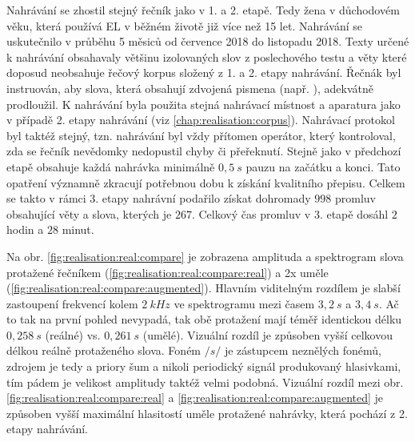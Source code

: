 Nahrávání se zhostil stejný řečník jako v 1. a 2. etapě. Tedy žena v důchodovém věku, která používá EL v běžném životě již více než 15 let. Nahrávání se uskutečnilo v průběhu 5 měsiců od července 2018 do listopadu 2018. Texty určené k nahrávání obsahavaly většinu izolovaných slov z poslechového testu a věty které doposud neobsahuje řečový korpus složený z 1. a 2. etapy nahrávání. Řečnák byl instruován, aby slova, která obsahují zdvojená pismena (např. ), adekvátně prodloužil. K nahrávání byla použita stejná nahrávací místnost a aparatura jako v případě 2. etapy nahrávání (viz \ref{chap:realisation:corpus}). Nahrávací protokol byl taktéž stejný, tzn. nahrávání byl vždy přítomen operátor, který kontroloval, zda se řečník nevědomky nedopustil chyby či přeřeknutí. Stejně jako v předchozí etapě obsahuje každá nahrávka minimálně $0,5\ s$ pauzu na začátku a konci. Tato opatření významně zkracují potřebnou dobu k získání kvalitního přepisu.
Celkem se takto v rámci 3. etapy nahrávní podařilo získat dohromady $998$ promluv obsahující věty a slova, kterých je $267$. Celkový čas promluv v 3. etapě dosáhl $2$ hodin a $28$ minut.

Na obr. \ref{fig:realisation:real:compare} je zobrazena amplituda a spektrogram slova  protažené řečníkem (\ref{fig:realisation:real:compare:real}) a 2x uměle (\ref{fig:realisation:real:compare:augmented}). Hlavním viditelným rozdílem je slabší zastoupení frekvencí kolem $2\ kHz$ ve spektrogramu mezi časem $3,2\ s$ a $3,4\ s$. Ač to tak na první pohled nevypadá, tak obě protažení mají téměř identickou délku $0,258\ s$ (reálné) vs. $0,261\ s$ (umělé). Vizuální rozdíl je způsoben vyšší celkovou délkou reálně protaženého slova. Foném $/s/$ je zástupcem neznělých fonémů, zdrojem je tedy a priory šum a nikoli periodický signál produkovaný hlasivkami, tím pádem je velikost amplitudy taktéž velmi podobná. Vizuální rozdíl mezi obr. \ref{fig:realisation:real:compare:real} a \ref{fig:realisation:real:compare:augmented} je způsoben vyšší maximální hlasitostí uměle protažené nahrávky, která pochází z 2. etapy nahrávání.


